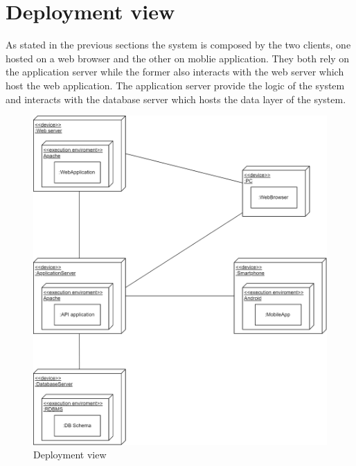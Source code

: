 \section{Deployment view}
As stated in the previous sections the system is composed by the two clients, one hosted on a web browser and the other on moblie application. They both rely on the application server while the former also interacts with the web server which host the web application.
The application server provide the logic of the system and interacts with the database server which hosts the data layer of the system.
\begin{figure}[H]
\caption{Deployment view}
\centering
\includegraphics[width = \textwidth]{sections/architecturalDesign/DeploymentView.png}
\end{figure}
